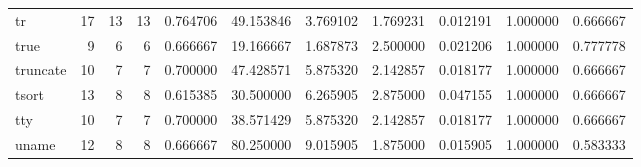 \begin{tabular}{lrrrrrrrrrr}
tr        &                                      17 &                 13 &                                13 &                                   0.764706 &                              49.153846 &                                     3.769102 &                          1.769231 &                                0.012191 &                           1.000000 &                                           0.666667 \\
true      &                                       9 &                  6 &                                 6 &                                   0.666667 &                              19.166667 &                                     1.687873 &                          2.500000 &                                0.021206 &                           1.000000 &                                           0.777778 \\
truncate  &                                      10 &                  7 &                                 7 &                                   0.700000 &                              47.428571 &                                     5.875320 &                          2.142857 &                                0.018177 &                           1.000000 &                                           0.666667 \\
tsort     &                                      13 &                  8 &                                 8 &                                   0.615385 &                              30.500000 &                                     6.265905 &                          2.875000 &                                0.047155 &                           1.000000 &                                           0.666667 \\
tty       &                                      10 &                  7 &                                 7 &                                   0.700000 &                              38.571429 &                                     5.875320 &                          2.142857 &                                0.018177 &                           1.000000 &                                           0.666667 \\
uname     &                                      12 &                  8 &                                 8 &                                   0.666667 &                              80.250000 &                                     9.015905 &                          1.875000 &                                0.015905 &                           1.000000 &                                           0.583333 \\

\end{tabular}
